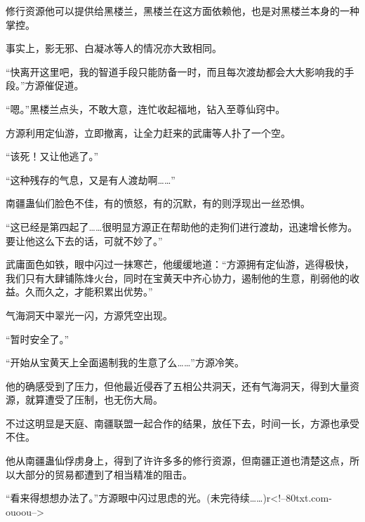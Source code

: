 \begin{this_body}
修行资源他可以提供给黑楼兰，黑楼兰在这方面依赖他，也是对黑楼兰本身的一种掌控。

事实上，影无邪、白凝冰等人的情况亦大致相同。

“快离开这里吧，我的智道手段只能防备一时，而且每次渡劫都会大大影响我的手段。”方源催促道。

“嗯。”黑楼兰点头，不敢大意，连忙收起福地，钻入至尊仙窍中。

方源利用定仙游，立即撤离，让全力赶来的武庸等人扑了一个空。

“该死！又让他逃了。”

“这种残存的气息，又是有人渡劫啊……”

南疆蛊仙们脸色不佳，有的愤怒，有的沉默，有的则浮现出一丝恐惧。

“这已经是第四起了……很明显方源正在帮助他的走狗们进行渡劫，迅速增长修为。要让他这么下去的话，可就不妙了。”

武庸面色如铁，眼中闪过一抹寒芒，他缓缓地道：“方源拥有定仙游，逃得极快，我们只有大肆铺陈烽火台，同时在宝黄天中齐心协力，遏制他的生意，削弱他的收益。久而久之，才能积累出优势。”

气海洞天中翠光一闪，方源凭空出现。

“暂时安全了。”

“开始从宝黄天上全面遏制我的生意了么……”方源冷笑。

他的确感受到了压力，但他最近侵吞了五相公共洞天，还有气海洞天，得到大量资源，就算遭受了压制，也无伤大局。

不过这明显是天庭、南疆联盟一起合作的结果，放任下去，时间一长，方源也承受不住。

他从南疆蛊仙俘虏身上，得到了许许多多的修行资源，但南疆正道也清楚这点，所以大部分的贸易都遭到了相当精准的阻击。

“看来得想想办法了。”方源眼中闪过思虑的光。(未完待续……)r<!--80txt.com-ouoou-->

\end{this_body}

